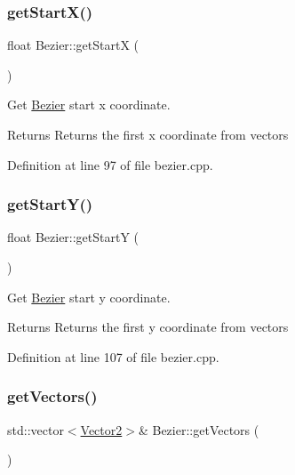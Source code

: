 \subsubsection{\texorpdfstring{get\+Start\+X()}{getStartX()}}
{\footnotesize\ttfamily float Bezier\+::get\+StartX (\begin{DoxyParamCaption}{ }\end{DoxyParamCaption})}



Get \mbox{\hyperlink{classBezier}{Bezier}} start x coordinate. 

\begin{DoxyReturn}{Returns}
Returns the first x coordinate from vectors 
\end{DoxyReturn}


Definition at line 97 of file bezier.\+cpp.

\mbox{\label{classBezier_ae310b53e4d8b3d586bbc4d335ac4cc08}} 
\subsubsection{\texorpdfstring{get\+Start\+Y()}{getStartY()}}
{\footnotesize\ttfamily float Bezier\+::get\+StartY (\begin{DoxyParamCaption}{ }\end{DoxyParamCaption})}



Get \mbox{\hyperlink{classBezier}{Bezier}} start y coordinate. 

\begin{DoxyReturn}{Returns}
Returns the first y coordinate from vectors 
\end{DoxyReturn}


Definition at line 107 of file bezier.\+cpp.

\mbox{\label{classBezier_a26bf332b0c831e0f302f1d72ec782436}} 
\subsubsection{\texorpdfstring{get\+Vectors()}{getVectors()}\hspace{0.1cm}{\footnotesize\ttfamily [1/2]}}
{\footnotesize\ttfamily std\+::vector$<$\mbox{\hyperlink{classVector2}{Vector2}}$>$\& Bezier\+::get\+Vectors (\begin{DoxyParamCaption}{ }\end{DoxyParamCaption})\hspace{0.3cm}{\ttfamily [inline]}}



